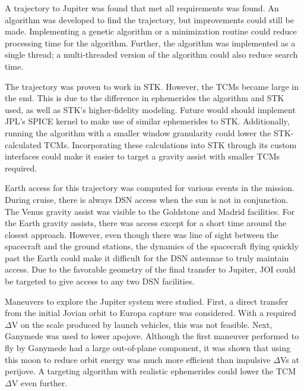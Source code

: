 \documentclass[]{aiaa-tc}%
\begin{document}
	A trajectory to Jupiter was found that met all requirements was found. An algorithm was developed to find the trajectory, but improvements could still be made. Implementing a genetic algorithm or a minimization routine could reduce processing time for the algorithm. Further, the algorithm was implemented as a single thread; a multi-threaded version of the algorithm could also reduce search time.

	\vspace{5 mm}

The trajectory was proven to work in STK. However, the TCMs became large in the end. This is due to the difference in ephemerides the algorithm and STK used, as well as STK's higher-fidelity modeling. Future would should implement JPL's SPICE kernel to make use of similar ephemerides to STK. Additionally, running the algorithm with a smaller window granularity could lower the STK-calculated TCMs. Incorporating these calculations into STK through its custom interfaces could make it easier to target a gravity assist with smaller TCMs required.

	\vspace{5 mm}

Earth access for this trajectory was computed for various events in the mission. During cruise, there is always DSN access when the sun is not in conjunction. The Venus gravity assist was visible to the Goldstone and Madrid facilities. For the Earth gravity assists, there was access except for a short time around the closest approach. However, even though there was line of sight between the spacecraft and the ground stations, the dynamics of the spacecraft flying quickly past the Earth could make it difficult for the DSN antennae to truly maintain access.  Due to the favorable geometry of the final transfer to Jupiter, JOI could be targeted to give access to any two DSN facilities. 

	\vspace{5 mm}

Maneuvers to explore the Jupiter system were studied. First, a direct transfer from the initial Jovian orbit to Europa capture was considered. With a required $\Delta$V on the scale produced by launch vehicles, this was not feasible. Next, Ganymede was used to lower apojove. Although the first maneuver performed to fly by Ganymede had a large out-of-plane component, it was shown that using this moon to reduce orbit energy was much more efficient than impulsive $\Delta$Vs at perijove. A targeting algorithm with realistic ephemerides could lower the TCM $\Delta$V even further.
\end{document}
